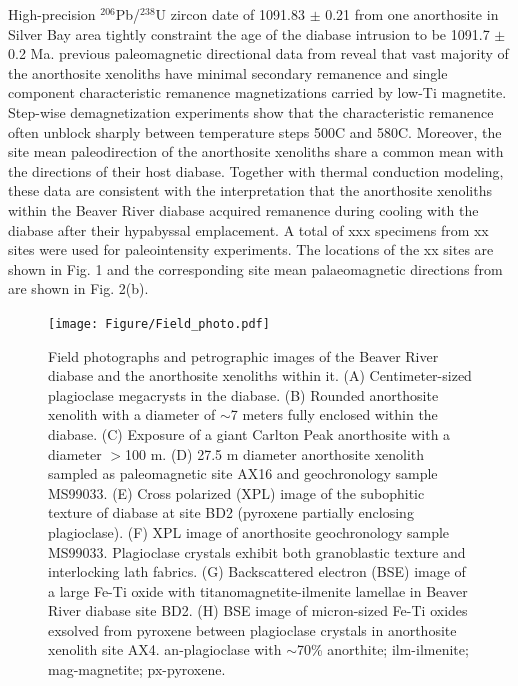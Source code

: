 \documentclass[draft]{agujournal2019}
\begin{document}
High-precision $^{206}$Pb/$^{238}$U zircon date of 1091.83 $\pm$ 0.21 from one anorthosite in Silver Bay area tightly constraint the age of the diabase intrusion to be 1091.7 $\pm$ 0.2 Ma. previous paleomagnetic directional data from  reveal that vast majority of the anorthosite xenoliths have minimal secondary remanence and single component characteristic remanence magnetizations carried by low-Ti magnetite. Step-wise demagnetization experiments show that the characteristic remanence often unblock sharply between temperature steps 500\textdegree C and 580\textdegree C. Moreover, the site mean paleodirection of the anorthosite xenoliths share a common mean with the directions of their host diabase. Together with thermal conduction modeling, these data are consistent with the interpretation that the anorthosite xenoliths within the Beaver River diabase acquired remanence during cooling with the diabase after their hypabyssal emplacement. A total of  xxx specimens from xx sites were used for paleointensity experiments. The locations of the xx sites are shown in Fig. 1 and the corresponding site mean palaeomagnetic directions from  are shown in Fig. 2(b).




\begin{figure}
\centering
\noindent\texttt{[image: Figure/Field\_photo.pdf]}
\caption{\footnotesize{Field photographs and petrographic images of the Beaver River diabase and the anorthosite xenoliths within it. (A) Centimeter-sized plagioclase megacrysts in the diabase. (B) Rounded anorthosite xenolith with a diameter of $\sim$7 meters fully enclosed within the diabase. (C) Exposure of a giant Carlton Peak anorthosite with a diameter $>$100 m. (D) 27.5 m diameter anorthosite xenolith sampled as paleomagnetic site AX16 and geochronology sample MS99033. (E) Cross polarized (XPL) image of the subophitic texture of diabase at site BD2 (pyroxene partially enclosing plagioclase). (F) XPL image of anorthosite geochronology sample MS99033. Plagioclase crystals exhibit both granoblastic texture and interlocking lath fabrics. (G) Backscattered electron (BSE) image of a large Fe-Ti oxide with titanomagnetite-ilmenite lamellae in Beaver River diabase site BD2. (H) BSE image of micron-sized Fe-Ti oxides exsolved from pyroxene between plagioclase crystals in anorthosite xenolith site AX4. an-plagioclase with $\sim$70\% anorthite; ilm-ilmenite; mag-magnetite; px-pyroxene.}}
\label{fig:Field_photo}
\end{figure}
\end{document}
